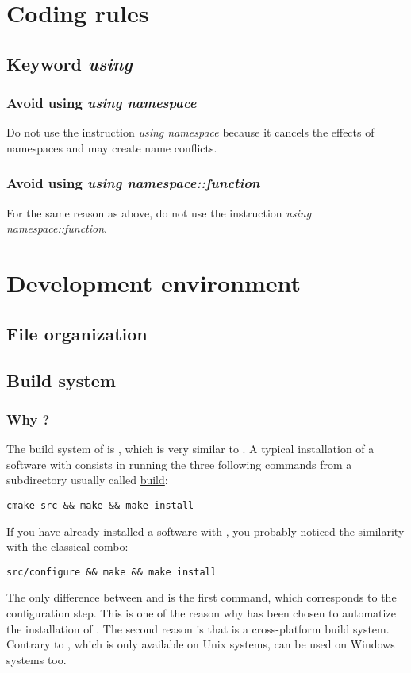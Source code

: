 


\chapter{Coding rules}


\section{Keyword \textit{using}}


\subsection{Avoid using \textit{using namespace}}

Do not use the instruction \textit{using namespace} because it cancels the effects of namespaces and may create name conflicts.


\subsection{Avoid using \textit{using namespace::function}} 

For the same reason as above, do not use the instruction \textit{using namespace::function}.



\chapter{Development environment}

\section{File organization}
\section{Build system}

\subsection{Why \CMake?}

The build system of \Simol is \CMake, which is very similar to \Make. A typical installation of a software with \CMake consists in running the three following commands from a subdirectory usually called \url{build}: 
\lstset{language=bash} 
\begin{lstlisting}
cmake src && make && make install
\end{lstlisting}
If you have already installed a software with \Make, you probably noticed the similarity with the classical combo:
\lstset{language=bash} 
\begin{lstlisting}
src/configure && make && make install
\end{lstlisting}
The only difference between \Make and \CMake is the first command, which corresponds to the configuration step. This is one of the reason why \CMake has been chosen to automatize the installation of \Simol. The second reason is that \CMake is a cross-platform build system. Contrary to \Make, which is only available on Unix systems, \CMake can be used on Windows systems too.

